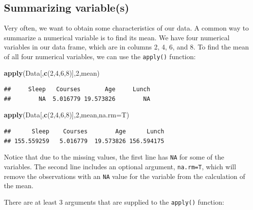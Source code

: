\documentclass[
]{book}
\newenvironment{Shaded}{\begin{snugshade}}{\end{snugshade}}
\newcommand{\AttributeTok}[1]{\textcolor[rgb]{0.13,0.29,0.53}{#1}}
\newcommand{\DecValTok}[1]{\textcolor[rgb]{0.00,0.00,0.81}{#1}}
\newcommand{\FunctionTok}[1]{\textcolor[rgb]{0.13,0.29,0.53}{\textbf{#1}}}
\newcommand{\NormalTok}[1]{#1}
\begin{document}
\hypertarget{summarizing-variables}{%
\subsection{Summarizing variable(s)}\label{summarizing-variables}}

Very often, we want to obtain some characteristics of our data. A common way to summarize a numerical variable is to find its mean. We have four numerical variables in our data frame, which are in columns 2, 4, 6, and 8. To find the mean of all four numerical variables, we can use the \texttt{apply()} function:

\begin{Shaded}
\begin{Highlighting}[]
\FunctionTok{apply}\NormalTok{(Data[,}\FunctionTok{c}\NormalTok{(}\DecValTok{2}\NormalTok{,}\DecValTok{4}\NormalTok{,}\DecValTok{6}\NormalTok{,}\DecValTok{8}\NormalTok{)],}\DecValTok{2}\NormalTok{,mean)}
\end{Highlighting}
\end{Shaded}

\begin{verbatim}
##     Sleep   Courses       Age     Lunch 
##        NA  5.016779 19.573826        NA
\end{verbatim}

\begin{Shaded}
\begin{Highlighting}[]
\FunctionTok{apply}\NormalTok{(Data[,}\FunctionTok{c}\NormalTok{(}\DecValTok{2}\NormalTok{,}\DecValTok{4}\NormalTok{,}\DecValTok{6}\NormalTok{,}\DecValTok{8}\NormalTok{)],}\DecValTok{2}\NormalTok{,mean,}\AttributeTok{na.rm=}\NormalTok{T)}
\end{Highlighting}
\end{Shaded}

\begin{verbatim}
##      Sleep    Courses        Age      Lunch 
## 155.559259   5.016779  19.573826 156.594175
\end{verbatim}

Notice that due to the missing values, the first line has \texttt{NA} for some of the variables. The second line includes an optional argument, \texttt{na.rm=T}, which will remove the observations with an \texttt{NA} value for the variable from the calculation of the mean.

There are at least 3 arguments that are supplied to the \texttt{apply()} function:
\end{document}
